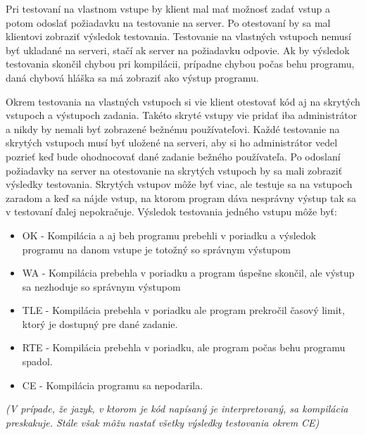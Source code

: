 Pri testovaní na vlastnom vstupe by klient mal mať možnosť zadať vstup a potom odoslať požiadavku
na testovanie na server. Po otestovaní by sa mal klientovi zobraziť výsledok testovania. Testovanie
na vlastných vstupoch nemusí byť ukladané na serveri, stačí ak server na požiadavku odpovie.
Ak by výsledok testovania skončil chybou pri kompilácii, prípadne chybou počas behu programu,
daná chybová hláška sa má zobraziť ako výstup programu.

Okrem testovania na vlastných vstupoch si vie klient otestovať kód aj na skrytých vstupoch a
výstupoch zadania. Takéto skryté vstupy vie pridať iba administrátor a nikdy by nemali byť zobrazené
bežnému používateľovi. Každé testovanie na skrytých vstupoch musí byť uložené na serveri, aby si ho
administrátor vedel pozrieť keď bude ohodnocovať dané zadanie bežného používateľa. Po odoslaní
požiadavky na server na otestovanie na skrytých vstupoch by sa mali zobraziť výsledky testovania.
Skrytých vstupov môže byť viac, ale testuje sa na vstupoch zaradom a keď sa nájde vstup, na ktorom
program dáva nesprávny výstup tak sa v testovaní ďalej nepokračuje.
Výsledok testovania jedného vstupu môže byť:
\begin{itemize}
\item OK - Kompilácia a aj beh programu prebehli v poriadku a výsledok programu na danom vstupe
je totožný so správnym výstupom
\item WA - Kompilácia prebehla v poriadku a program úspešne skončil, ale výstup sa nezhoduje so
správnym výstupom
\item TLE - Kompilácia prebehla v poriadku ale program prekročil časový limit, ktorý je dostupný 
pre dané zadanie.
\item RTE - Kompilácia prebehla v poriadku, ale program počas behu programu spadol.
\item CE - Kompilácia programu sa nepodarila.
\end{itemize}
\textit{(V prípade, že jazyk, v ktorom je kód napísaný je interpretovaný, sa kompilácia preskakuje.
Stále však môžu nastať všetky výsledky testovania okrem CE)}
